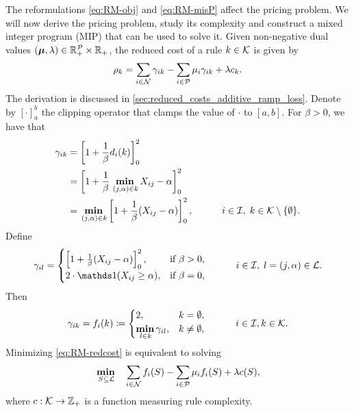 The reformulations \eqref{eq:RM-obj} and \eqref{eq:RM-misP} affect the pricing problem.
We will now derive the pricing problem, study its complexity and construct a mixed integer program (MIP) that can be used to solve it.
Given non-negative dual values $(\bm{\mu}, \lambda) \in \mathbb{R}_+^{\mathcal{P}} \times \mathbb{R}_+$, the reduced cost of a rule $k \in \mathcal{K}$ is given by
\begin{equation} \label{eq:RM-redcost}
    \rho_k = \sum_{i \in \mathcal{N}} \gamma_{ik} - \sum_{i \in \mathcal{P}} \mu_{i}\gamma_{ik} + \lambda c_k.
\end{equation}
The derivation is discussed in \autoref{sec:reduced_costs_additive_ramp_loss}.
Denote by $[\cdot]_a^b$ the clipping operator that clamps the value of $\cdot$ to $[a,b].$
For $\beta > 0$, we have that
\begin{equation}\label{eq:gamma_ik_min}
\begin{split}
        \gamma_{ik} &= \left[1 + \frac{1}{\beta} d_i(k) \right]_0^2 \\
        &= \left[1 + \frac{1}{\beta}\mathop{\text{\textbf{min}}}\limits_{\,(j,\alpha) \in k} X_{ij} - \alpha\right]_0^2 \\
        &= \mathop{\text{\textbf{min}}}\limits_{\,(j,\alpha) \in k} \left[1 + \frac{1}{\beta}(X_{ij} - \alpha)\right]_{0}^{2}, \quad \quad \quad i \in \mathcal{I},\; k \in \mathcal{K}\setminus\{\emptyset\}.
\end{split}
\end{equation}
Define
\begin{equation}\label{eq:gamma_{il}}
    \gamma_{il} = \begin{cases}
                      \left[1 + \frac{1}{\beta}(X_{ij} - \alpha)\right]_{0}^{2}, & \text{if $\beta > 0$,} \\
                      2\cdot \Ind(X_{ij} \geq \alpha), & \text{if $\beta = 0$,}
    \end{cases} \tquad i \in \I, \; l = (j,\alpha) \in \L.
\end{equation}
Then
\begin{equation}\label{eq:f_min}
    \gamma_{ik} = f_i(k) \coloneq \begin{cases}
                               2, & k = \emptyset, \\
                               \mathop{\text{\textbf{min}}}\limits_{\,l \in k} \gamma_{il}, & k\neq \emptyset, \\
    \end{cases} \quad \quad \quad i \in \mathcal{I}, k \in \mathcal{K}.
\end{equation}
Minimizing \eqref{eq:RM-redcost} is equivalent to solving
\begin{equation}\label{eq:RP_set_formulation}
    \mathop{\text{\textbf{min}}}\limits_{\,S \subseteq \mathcal{L}} \quad \sum\limits_{i \in \mathcal{N}} f_i(S)  - \sum\limits_{i \in \mathcal{P}}  \mu_i f_i(S) + \lambda c(S),
\end{equation}
where $c: \mathcal{K} \to \mathbb{Z}_+$ is a function measuring rule complexity.

